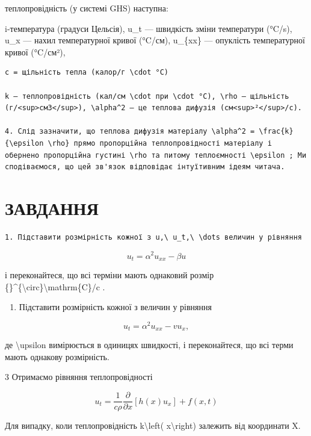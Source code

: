 \documentclass[
]{article}
\providecommand{\tightlist}{%
  \setlength{\itemsep}{0pt}\setlength{\parskip}{0pt}}
\begin{document}
теплопровідність (у системі GHS) наступна:

i-температура (градуси Цельсія), u\_t --- швидкість зміни температури
(°C/s), u\_x --- нахил температурної кривої (°C/см), u\_\{xx\} ---
опуклість температурної кривої (°C/см²),

\begin{verbatim}
c = щільність тепла (калор/г \cdot °C)

k — теплопровідність (кал/см \cdot при \cdot °C), \rho — щільність (г/<sup>см3</sup>), \alpha^2 — це теплова дифузія (см<sup>²</sup>/с).

4. Слід зазначити, що теплова дифузія матеріалу \alpha^2 = \frac{k}{\epsilon \rho} прямо пропорційна теплопровідності матеріалу і обернено пропорційна густині \rho та питому теплоємності \epsilon ; Ми сподіваємося, що цей зв'язок відповідає інтуїтивним ідеям читача.
\end{verbatim}

\section{ЗАВДАННЯ}\label{ux437ux430ux432ux434ux430ux43dux43dux44f}

\begin{verbatim}
1. Підставити розмірність кожної з u,\ u_t,\ \dots величин у рівняння
\end{verbatim}

\[
u_t = \alpha^2 u_{xx} - \beta u
\]

і переконайтеся, що всі терміни мають однаковий розмір
\{\}\^{}\{\textbackslash circ\}\textbackslash mathrm\{C\}/c .

\begin{enumerate}
\def\labelenumi{\arabic{enumi}.}
\setcounter{enumi}{1}
\tightlist
\item
  Підставити розмірність кожної з величин у рівняння
\end{enumerate}

\[
u_t = \alpha^2 u_{xx} - v u_x,
\]

де \textbackslash upsilon вимірюється в одиницях швидкості, і
переконайтеся, що всі терми мають однакову розмірність.

3 Отримаємо рівняння теплопровідності

\[
u_{t} = \frac{1}{c\rho} \frac{\partial}{\partial x} [h(x) u_{x}] + f(x, t)
\]

Для випадку, коли теплопровідність k\textbackslash left(
x\textbackslash right) залежить від координати X.
\end{document}
